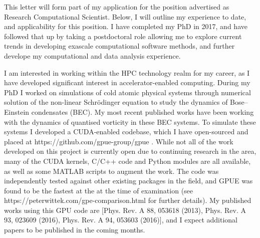 \documentclass[11pt,a4paper,unicode]{moderncv}
\begin{document}
{This letter will form part of my application for the position advertised as Research Computational Scientist. Below, I will outline my experience to date, and applicability for this position. I have completed my PhD in 2017, and have followed that up by taking a postdoctoral role allowing me to explore current trends in developing exascale computational software methods, and further develope my computational and data analysis experience.

I am interested in working within the HPC technology realm for my career, as I have developed significant interest in accelerator-enabled computing. During my PhD I worked on simulations of cold atomic physical systems through numerical solution of the non-linear Schr\"odinger equation to study the dynamics of Bose--Einstein condensates (BEC). My most recent published works have been working with the dynamics of quantised vorticity in these BEC systems. To simulate these systems I developed a CUDA-enabled codebase, which I have open-sourced and placed at https://github.com/gpue-group/gpue .  While not all of the work developed on this project is currently open due to continuing research in the area, many of the CUDA kernels, C/C++ code and Python modules are all available, as well as some MATLAB scripts to augment the work. The code was independently tested against other existing packages in the field, and GPUE was found to be the fastest at the at the time of examination (see https://peterwittek.com/gpe-comparison.html for further details). My published works using this GPU code are [Phys. Rev. A 88, 053618 (2013), Phys. Rev. A 93, 023609 (2016), Phys. Rev. A 94, 053603 (2016)], and I expect additional papers to be published in the coming months.

}
\end{document}
